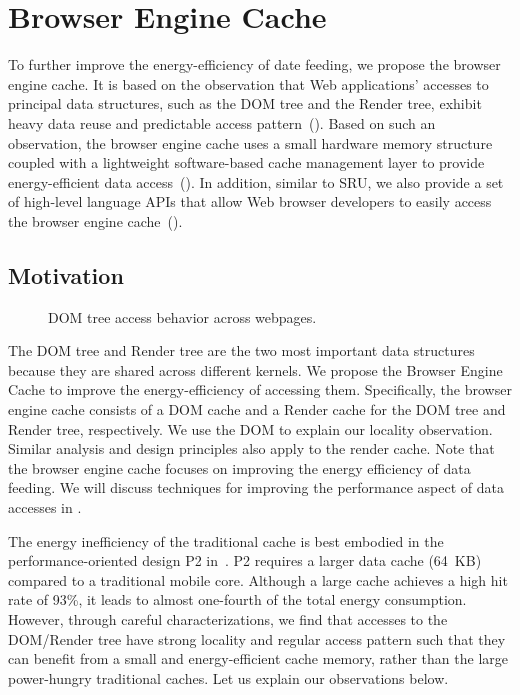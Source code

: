 \section{Browser Engine Cache}
\label{sec:arch:cache}

To further improve the energy-efficiency of date feeding, we propose the browser engine cache. It is based on the observation that Web applications' accesses to principal data structures, such as the DOM tree and the Render tree, exhibit heavy data reuse and predictable access pattern~(). Based on such an observation, the browser engine cache uses a small hardware memory structure coupled with a lightweight software-based cache management layer to provide energy-efficient data access~(). In addition, similar to SRU, we also provide a set of high-level language APIs that allow Web browser developers to easily access the browser engine cache~().

\subsection{Motivation}
\label{sec:cache:motivation}

\begin{figure}[t]
\centering
{}
\hspace*{15pt}
\caption{DOM tree access behavior across webpages.}
\label{fig:dom-loc}
\end{figure}

The DOM tree and Render tree are the two most important data structures because they are shared across different kernels. We propose the Browser Engine Cache to improve the energy-efficiency of accessing them. Specifically, the browser engine cache consists of a DOM cache and a Render cache for the DOM tree and Render tree, respectively. We use the DOM to explain our locality observation. Similar analysis and design principles also apply to the render cache. Note that the browser engine cache focuses on improving the energy efficiency of data feeding. We will discuss techniques for improving the performance aspect of data accesses in .

The energy inefficiency of the traditional cache is best embodied in the performance-oriented design P2 in~. P2 requires a larger data cache (64~KB) compared to a traditional mobile core. Although a large cache achieves a high hit rate of 93\%, it leads to almost one-fourth of the total energy consumption. However, through careful characterizations, we find that accesses to the DOM/Render tree have strong locality and regular access pattern such that they can benefit from a small and energy-efficient cache memory, rather than the large power-hungry traditional caches. Let us explain our observations below.

